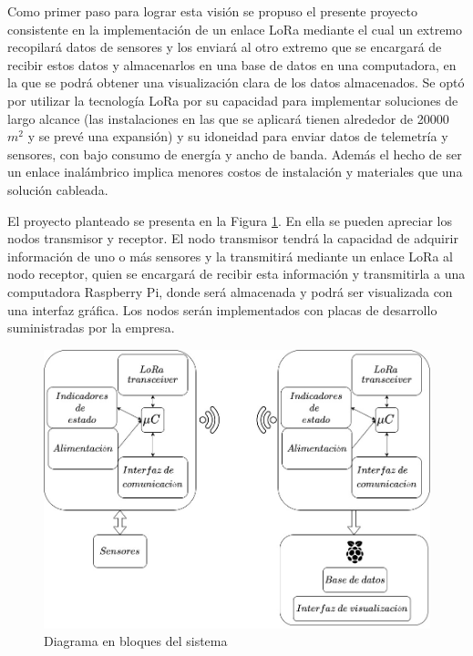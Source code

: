 \documentclass[11pt]{charter}
\begin{document}
Como primer paso para lograr esta visión se propuso el presente proyecto consistente en la implementación de un enlace LoRa mediante el cual un extremo recopilará datos de sensores y los enviará al otro extremo que se encargará de recibir estos datos y almacenarlos en una base de datos en una computadora, en la que se podrá obtener una visualización clara de los datos almacenados.
Se optó por utilizar la tecnología LoRa por su capacidad para implementar soluciones de largo alcance (las instalaciones en las que se aplicará tienen alrededor de 20000 $m^2$ y se prevé una expansión) y su idoneidad para enviar datos de telemetría y sensores, con bajo consumo de energía y ancho de banda. Además el hecho de ser un enlace inalámbrico implica menores costos de instalación y materiales que una solución cableada.

El proyecto planteado se presenta en la Figura \ref{fig:diagBloques}. En ella se pueden apreciar los nodos transmisor y receptor. El nodo transmisor tendrá la capacidad de adquirir información de uno o más sensores y la transmitirá mediante un enlace LoRa al nodo receptor, quien se encargará de recibir esta información y transmitirla a una computadora Raspberry Pi, donde será almacenada y podrá ser visualizada con una interfaz gráfica. Los nodos serán implementados con placas de desarrollo suministradas por la empresa.

\vspace{25px}

\begin{figure}[htpb]
\centering 
\includegraphics[width=.7\textwidth]{./Figuras/DiagDeBloques.jpg}
\caption{Diagrama en bloques del sistema}
\label{fig:diagBloques}
\end{figure}

\vspace{25px}
\end{document}
